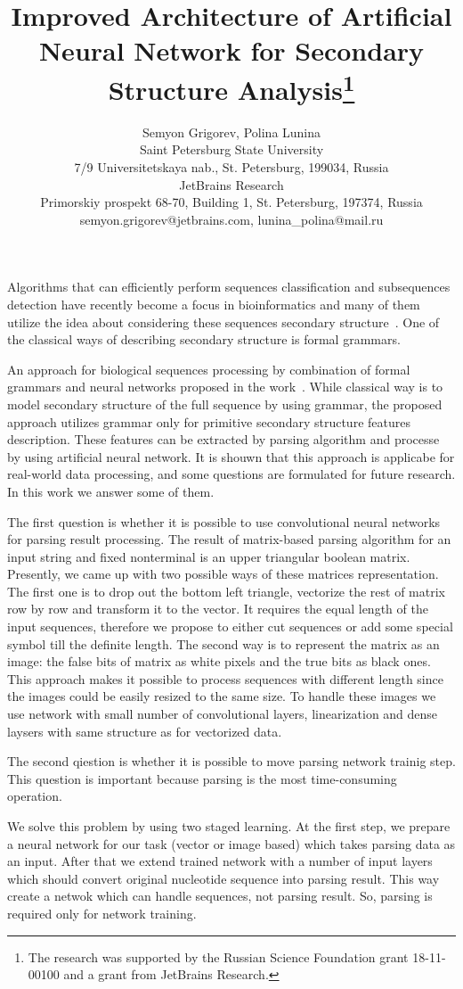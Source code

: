 \documentclass[12pt]{article}  %
\title{Improved Architecture of Artificial Neural Network for Secondary Structure Analysis\footnote{The research was supported by the Russian Science Foundation grant 18-11-00100 and a grant from JetBrains Research.}}
\author{Semyon Grigorev, Polina Lunina
\\ 
       \small{Saint Petersburg State University}\\
       \small{7/9 Universitetskaya nab., St. Petersburg, 199034, Russia}\\
       \small{JetBrains Research}\\
       \small{Primorskiy prospekt 68-70, Building 1, St. Petersburg, 197374, Russia} \\
       \small{semyon.grigorev@jetbrains.com, lunina\_polina@mail.ru}
       }
\date{}
\theoremstyle{definition}
\theoremstyle{remark}
\begin{document}
\maketitle
Algorithms that can efficiently perform sequences classification and subsequences detection have recently become a focus in bioinformatics and many of them utilize the idea about considering these sequences secondary structure~\cite{GrammarsRNA, PCFG, meta, LWPCFG}. One of the classical ways of describing secondary structure is formal grammars.

An approach for biological sequences processing by combination of formal grammars and neural networks proposed in the work~\cite{grigorevcomposition}.
While classical way is to model secondary structure of the full sequence by using grammar, the proposed approach utilizes grammar only for primitive secondary structure features description. These features can be extracted by parsing algorithm and processe by using artificial neural network. It is shouwn that this approach is applicabe for real-world data processing, and some questions are formulated for future research. In this work we answer some of them.  

The first question is whether it is possible to use convolutional neural networks for parsing result processing. The result of matrix-based parsing algorithm for an input string and fixed nonterminal is an upper triangular boolean matrix. Presently, we came up with two possible ways of these matrices representation. The first one is to drop out the bottom left triangle, vectorize the rest of matrix row by row and transform it to the vector. It requires the equal length of the input sequences, therefore we propose to either cut sequences or add some special symbol till the definite length. The second way is to represent the matrix as an image: the false bits of matrix as white pixels and the true bits as black ones. This approach makes it possible to process sequences with different length since the images could be easily resized to the same size. 
To handle these images we use network with small number of convolutional layers, linearization and dense laysers with same structure as for vectorized data.

The second qiestion is whether it is possible to move parsing network trainig step. This question is important because parsing is the most time-consuming operation.

We solve this problem by using two staged learning. At the first step, we prepare a neural network for our task (vector or image based) which takes parsing data as an input. After that we extend trained network with a number of input layers which should convert original nucleotide sequence into parsing result. This way create a netwok which can handle sequences, not parsing result. So, parsing is required only for network training.
\end{document}
